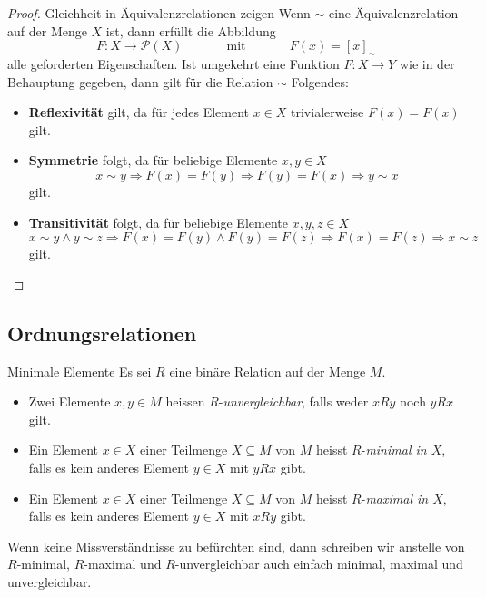     \begin{proof}{Gleichheit in Äquivalenzrelationen zeigen}
    Wenn $\sim$ eine Äquivalenzrelation auf der Menge $X$ ist, dann erfüllt die Abbildung
    \[
    F:X\to\mathcal{P}(X)\phantom{abstand}\text{mit} \phantom{abstand} F(x)=[x]_\sim
    \]
    alle geforderten Eigenschaften. Ist umgekehrt eine Funktion $F:X\to Y$ wie in der Behauptung gegeben, dann gilt für die Relation $\sim$ Folgendes:
    \begin{itemize}
    \item\textbf{Reflexivität} gilt, da für jedes Element $x\in X$ trivialerweise $F(x)=F(x)$ gilt.
    \item \textbf{Symmetrie} folgt, da für beliebige Elemente $x,y\in X$
    \[
    x\sim y\Rightarrow F(x)=F(y)\Rightarrow F(y)=F(x)\Rightarrow y\sim x
    \]
    gilt.
    \item\textbf{Transitivität} folgt, da für beliebige Elemente $x,y,z\in X$
    \[
    x\sim y\land y\sim z\Rightarrow F(x)=F(y)\land F(y)=F(z)\Rightarrow F(x)=F(z)\Rightarrow  x\sim z
    \]
    gilt.
    \end{itemize}
    \end{proof}


    \subsection*{Ordnungsrelationen}

    \begin{definition}{Minimale Elemente}
    Es sei $R$ eine binäre Relation auf der Menge $M$.
    \begin{itemize}
    \item Zwei Elemente $x,y\in M$ heissen $R$-\textit{unvergleichbar}, falls weder $xRy$ noch $yRx$ gilt.
    \item Ein Element $x\in X$ einer Teilmenge $X\subseteq M$ von $M$ heisst $R$-\textit{minimal in $X$}, falls es kein anderes Element $y\in X$ mit $yRx$ gibt.
    \item  Ein Element $x\in X$ einer Teilmenge $X\subseteq M$ von $M$ heisst $R$-\textit{maximal in $X$}, falls es kein anderes Element $y\in X$ mit $xRy$ gibt.
    \end{itemize}
    Wenn keine Missverständnisse zu befürchten sind, dann schreiben wir anstelle von $R$-minimal, $R$-maximal und $R$-unvergleichbar auch einfach minimal, maximal und unvergleichbar.
    \end{definition}


